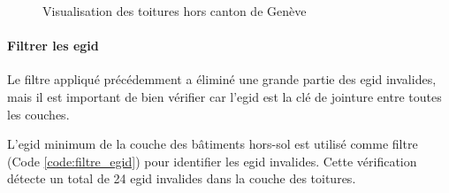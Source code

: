 \begin{figure}[H]
    \caption{Visualisation des toitures hors canton de Genève}
    \label{fig:ch3_preparation_donnees_03_hors_canton}
\end{figure}

\newpage
\paragraph{Filtrer les \gls{egid}}
Le filtre appliqué précédemment a éliminé une grande partie des \gls{egid} invalides, mais il est important de bien vérifier car l'\gls{egid} est la clé de jointure entre toutes les couches.

L'\gls{egid} minimum de la couche des bâtiments hors-sol est utilisé comme filtre (Code \ref{code:filtre_egid}) pour identifier les \gls{egid} invalides. Cette vérification détecte un total de 24 \gls{egid} invalides dans la couche des toitures.

